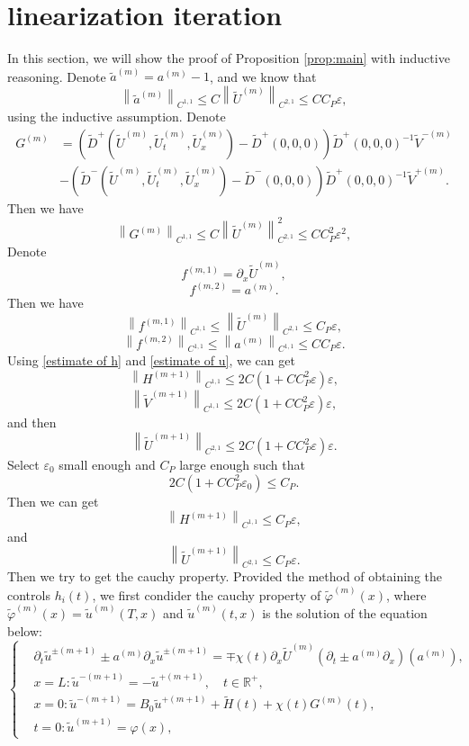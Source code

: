 \documentclass[a4paper,reqno,11pt]{amsart}
\numberwithin{equation}{section} %
\begin{document}
\section{linearization iteration}
In this section, we will show the proof of Proposition \ref{prop:main} with inductive reasoning. 
Denote $\tilde{a}^{(m)}=a^{(m)}-1$, and we know that
$$
\left\| \tilde{a}^{(m)} \right\| _{C^{1,1}}\leq C\left\| \tilde{U}^{(m)} \right\| _{C^{2,1}}\leq CC_P\varepsilon ,
$$
using the inductive assumption.
Denote
$$
\begin{aligned}
	G^{(m)} &=\left(\widetilde{D}^{+}\left(\widetilde{U}^{(m)}, \widetilde{U}_t^{(m)}, \widetilde{U}_x^{(m)}\right)-\widetilde{D}^{+}(0,0,0)\right) \widetilde{D}^{+}(0,0,0)^{-1} \widetilde{V}^{-(m)} \\
		& -\left(\widetilde{D}^{-}\left(\widetilde{U}^{(m)}, \widetilde{U}_t^{(m)}, \widetilde{U}_x^{(m)}\right)-\widetilde{D}^{-}(0,0,0)\right) \widetilde{D}^{+}(0,0,0)^{-1} \widetilde{V}^{+(m)}.
\end{aligned}
$$
Then we have
$$
\left\| G^{(m)} \right\| _{C^{1,1}}\leq C\left\| \tilde{U}^{(m)} \right\| _{C^{2,1}}^{2}\leq CC_{P}^{2}\varepsilon ^2,
$$
Denote
$$
f^{(m,1)}=\partial _x\tilde{U}^{(m)},
$$
$$
f^{\left( m,2 \right)}=a^{\left( m \right)}.
$$
Then we have
$$
\left\| f^{(m,1)} \right\| _{C^{1,1}}\le \left\| \tilde{U}^{(m)} \right\| _{C^{2,1}}\leq C_P\varepsilon ,
$$
$$
\left\| f^{(m,2)} \right\| _{C^{1,1}}\le \left\| a^{\left( m \right)} \right\| _{C^{1,1}}\leq CC_P\varepsilon .
$$
Using \eqref{estimate of h} and \eqref{estimate of u}, we can get
$$
\left\| H^{(m+1)} \right\| _{C^{1,1}}\leq 2C\left( 1+CC_{P}^{2}\varepsilon \right) \varepsilon, 
$$
$$
\left\| \tilde{V}^{(m+1)} \right\| _{C^{1,1}} \leq 2C\left( 1+CC_{P}^{2}\varepsilon \right) \varepsilon ,
$$
and then
$$
\left\| \tilde{U}^{(m+1)} \right\| _{C^{2,1}} \leq 2C\left( 1+CC_{P}^{2}\varepsilon \right) \varepsilon .
$$
Select $\varepsilon _0$ small enough and $C_P$ large enough such that
$$
2C\left( 1+CC_{P}^{2}\varepsilon _0 \right) \leq C_P.
$$
Then we can get
$$
\left\| H^{(m+1)} \right\| _{C^{1,1}}\leq C_P\varepsilon,
$$
and
$$
\left\| \tilde{U}^{(m+1)} \right\| _{C^{2,1}}\leq C_P\varepsilon.
$$
Then we try to get the cauchy property. Provided the method of obtaining the controls $h_i(t)$, we first condider the cauchy property of $\tilde{\varphi }^{(m)}(x)$, where $\tilde{\varphi }^{(m)}(x)=\tilde{u}^{(m)}(T,x)$ and $\tilde{u}^{(m)}(t,x)$ is the solution of the equation below:
$$
\begin{cases}
	&		\partial _t\widetilde{u}^{\pm (m+1)}\pm a^{(m)}\partial _x\widetilde{u}^{\pm (m+1)}=\mp \chi \left( t \right) \partial _x\widetilde{U}^{(m)}\left( \partial _t\pm a^{(m)}\partial _x \right) \left( a^{(m)} \right) ,\\
	&		x=L:\widetilde{u}^{-(m+1)}=-\widetilde{u}^{+(m+1)},\quad t\in \mathbb{R} ^+,\\
	&		x=0:\widetilde{u}^{-(m+1)}=B_0\widetilde{u}^{+(m+1)}+\widetilde{H}(t)+\chi \left( t \right)G^{\left( m \right)}\left( t \right) ,\\
	&		t=0:\widetilde{u}^{(m+1)}=\varphi \left( x \right) ,
\end{cases}
$$
\end{document}
